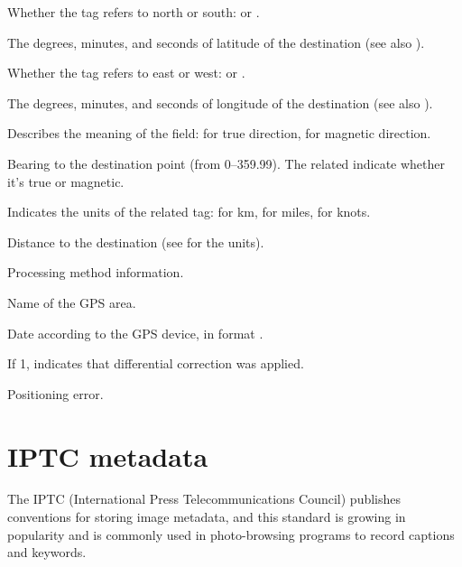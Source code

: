 Whether the  tag refers to north or south:  or 
.
\apiend

The degrees, minutes, and seconds of latitude of the destination (see also 
).
\apiend

Whether the  tag refers to east or west:  or 
.
\apiend

The degrees, minutes, and seconds of longitude of the destination (see also 
).
\apiend

Describes the meaning of the  field:  for true
direction,  for magnetic direction.
\apiend

Bearing to the destination point (from 0--359.99).  The
related  indicate whether it's true or magnetic.
\apiend

Indicates the units of the related  tag: 
 for km,  for miles,  for knots.
\apiend

Distance to the destination (see  for the units).
\apiend

Processing method information.
\apiend

Name of the GPS area.
\apiend

Date according to the GPS device, in format .
\apiend

If 1, indicates that differential correction was applied.
\apiend

Positioning error.
\apiend



\section{IPTC metadata}
\label{sec:metadata:iptc}

The IPTC (International Press Telecommunications Council) publishes
conventions for storing image metadata, and this standard is growing
in popularity and is commonly used in photo-browsing programs to
record captions and keywords.

